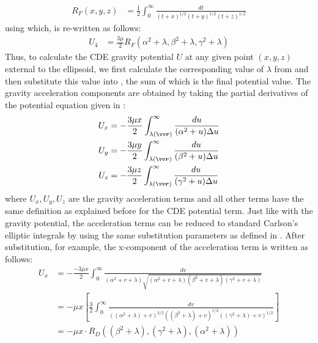\begin{align}
    R_F(x, y, z) &= \frac{1}{2} \int_0^\infty \frac{dt}{(t+x)^{1/2}(t+y)^{1/2}(t+z)^{1/2}}
    \label{eqn:carlson_RF}
\end{align}
using which,  is re-written as follows:
\begin{align}
    U_4 &= \frac{3\mu}{2} R_F(\alpha^2 + \lambda, \beta^2 + \lambda, \gamma^2 + \lambda)
    \label{eqn:ellipsoid_potential_split_4_carlson}
\end{align}
Thus, to calculate the \gls{CDE} gravity potential $U$ at any given point $(x,y,z)$ external to the ellipsoid, we first calculate the corresponding value of $\lambda$ from  and then substitute this value into , the sum of which is the final potential value.
%
\newline\newline
%
The gravity acceleration components are obtained by taking the partial derivatives of the potential equation given in  \parencite{scheeresBook}:
\begin{align}
    U_x &= -\frac{3\mu x}{2} \int_{\lambda(\bvector{r})}^{\infty} \frac{du}{(\alpha^2 + u) \Delta u}
    \label{eqn:grav_acc_x} \\
    U_y &= -\frac{3\mu y}{2} \int_{\lambda(\bvector{r})}^{\infty} \frac{du}{(\beta^2 + u) \Delta u}
    \label{eqn:grav_acc_y} \\
    U_z &= -\frac{3\mu z}{2} \int_{\lambda(\bvector{r})}^{\infty} \frac{du}{(\gamma^2 + u) \Delta u}
    \label{eqn:grav_acc_z}
\end{align}
where $U_x, U_y, U_z$ are the gravity acceleration terms and all other terms have the same definition as explained before for the \gls{CDE} potential term. Just like with the gravity potential, the acceleration terms can be reduced to standard Carlson's elliptic integrals by using the same substitution parameters as defined in . After substitution, for example, the x-component of the acceleration term is written as follows:
\begin{align}
    U_x &= -\frac{-3\mu x}{2} \int_{0}^{\infty} \frac{dv}{(\alpha^2 + v + \lambda)\sqrt{(\alpha^2 + v + \lambda)(\beta^2 + v + \lambda)(\gamma^2 + v + \lambda)}} \\
    &= -\mu x \left[\frac{3}{2} \int_0^\infty \frac{dv}{((\alpha^2 + \lambda) + v)^{3/2} ((\beta^2 + \lambda) + v)^{1/2} ((\gamma^2 + \lambda) + v)^{1/2}} \right] \\
    &= -\mu x \cdotp R_D((\beta^2 + \lambda), (\gamma^2 + \lambda), (\alpha^2 + \lambda))
    \label{eqn:grav_acc_x_carlson}
\end{align}
